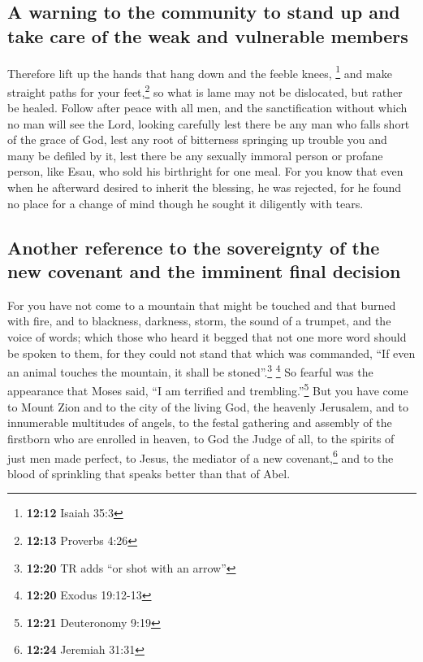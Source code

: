 \hypertarget{a-warning-to-the-community-to-stand-up-and-take-care-of-the-weak-and-vulnerable-members}{%
\subsection{A warning to the community to stand up and take care of the
weak and vulnerable
members}\label{a-warning-to-the-community-to-stand-up-and-take-care-of-the-weak-and-vulnerable-members}}

 Therefore lift up the hands that hang down and the
feeble knees, \footnote{\textbf{12:12} Isaiah 35:3}  and
make straight paths for your feet,\footnote{\textbf{12:13} Proverbs 4:26}
so what is lame may not be dislocated, but rather be healed.
 Follow after peace with all men, and the sanctification
without which no man will see the Lord,  looking
carefully lest there be any man who falls short of the grace of God,
lest any root of bitterness springing up trouble you and many be defiled
by it,  lest there be any sexually immoral person or
profane person, like Esau, who sold his birthright for one meal.
 For you know that even when he afterward desired to
inherit the blessing, he was rejected, for he found no place for a
change of mind though he sought it diligently with tears.

\hypertarget{another-reference-to-the-sovereignty-of-the-new-covenant-and-the-imminent-final-decision}{%
\subsection{Another reference to the sovereignty of the new covenant and
the imminent final
decision}\label{another-reference-to-the-sovereignty-of-the-new-covenant-and-the-imminent-final-decision}}

 For you have not come to a mountain that might be
touched and that burned with fire, and to blackness, darkness, storm,
 the sound of a trumpet, and the voice of words; which
those who heard it begged that not one more word should be spoken to
them,  for they could not stand that which was commanded,
``If even an animal touches the mountain, it shall be
stoned''.\footnote{\textbf{12:20} TR adds ``or shot with an arrow''}
\footnote{\textbf{12:20} Exodus 19:12-13}  So fearful was
the appearance that Moses said, ``I am terrified and
trembling.''\footnote{\textbf{12:21} Deuteronomy 9:19} 
But you have come to Mount Zion and to the city of the living God, the
heavenly Jerusalem, and to innumerable multitudes of angels,
 to the festal gathering and assembly of the firstborn
who are enrolled in heaven, to God the Judge of all, to the spirits of
just men made perfect,  to Jesus, the mediator of a new
covenant,\footnote{\textbf{12:24} Jeremiah 31:31} and to the blood of
sprinkling that speaks better than that of Abel.

